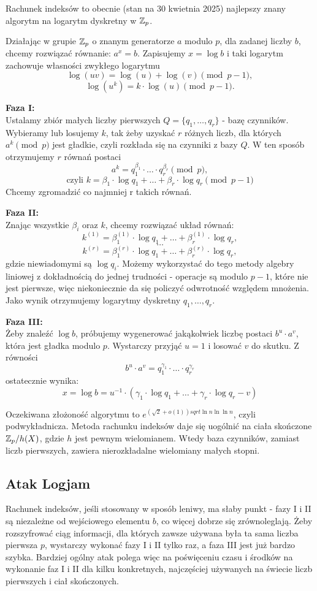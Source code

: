 Rachunek indeksów to obecnie (stan na 30 kwietnia 2025) najlepszy znany algorytm na
logarytm dyskretny w \( \mathbb{Z}_p \).

Działając w grupie \( \mathbb{Z}_p \) o znanym generatorze \( a \) modulo \( p \), dla zadanej liczby \( b \), chcemy rozwiązać równanie: \( a^x = b \).
Zapisujemy \( x = \log b \) i taki logarytm zachowuje własności zwykłego logarytmu
\[ \log(uv) = \log(u) + \log(v) \pmod{p-1}, \]
\[ \log(u^k) = k \cdot \log(u) \pmod{p-1}. \]

\textbf{Faza I:} \\
Ustalamy zbiór małych liczby pierwszych \( Q = \{q_1, \dots, q_r\} \) - bazę czynników.
Wybieramy lub losujemy \( k \), tak żeby uzyskać \( r \) różnych liczb, dla których \( a^k \pmod{p} \) jest gładkie, czyli rozkłada się na czynniki z bazy \( Q \). W ten sposób otrzymujemy \( r \) równań postaci
\[ a^k = q_1^{\beta_1} \cdot \ldots \cdot q_r^{\beta_r} \pmod{p}, \]
\[ \text{czyli } k = \beta_1 \cdot \log q_1 + \ldots + \beta_r \cdot \log q_r \pmod{p - 1} \]
Chcemy zgromadzić co najmniej r takich równań.

\textbf{Faza II:} \\
Znając wszystkie \( \beta_i \) oraz \( k \), chcemy rozwiązać układ równań:
\[ k^{(1)} = \beta_1^{(1)} \cdot \log q_1 + \ldots + \beta_r^{(1)} \cdot \log q_r, \]
\[ \dots \]
\[ k^{(r)} = \beta_1^{(r)} \cdot \log q_1 + \ldots + \beta_r^{(r)} \cdot \log q_r, \]
gdzie niewiadomymi są \( \log q_i \). Możemy wykorzystać do tego metody algebry liniowej z dokładnością do jednej trudności - operacje są modulo \( p-1 \), które nie jest pierwsze, więc niekoniecznie da się policzyć odwrotność względem mnożenia.
Jako wynik otrzymujemy logarytmy dyskretny \( q_1, \dots, q_r \).

\textbf{Faza III:} \\
Żeby znaleźć \( \log b \), próbujemy wygenerować jakąkolwiek liczbę postaci \( b^u \cdot a^v \), która jest gładka modulo \( p \). Wystarczy przyjąć \( u = 1 \) i losować \( v \) do skutku. Z równości
\[ b^u \cdot a^v = q_1^{\gamma_1} \cdot \ldots \cdot q_r^{\gamma_r} \]
ostatecznie wynika:
\[ x = \log b = u^{−1} \cdot (\gamma_1 \cdot \log q_1 + \ldots + \gamma_r \cdot \log q_r - v) \]

Oczekiwana złożoność algorytmu to \( e^{(\sqrt{2}+o(1))sqrt{\ln n \ln\ln n}} \), czyli podwykładnicza. Metoda rachunku indeksów daje się uogólnić na ciała skończone \( \mathbb{Z}_p/h(X) \), gdzie \( h \) jest pewnym wielomianem. Wtedy baza czynników, zamiast liczb pierwszych, zawiera nierozkładalne wielomiany małych stopni.

\subsection{Atak Logjam}
Rachunek indeksów, jeśli stosowany w sposób leniwy, ma słaby punkt - fazy I i II są niezależne od wejściowego elementu \( b \), co więcej dobrze się zrównoleglają.
Żeby rozszyfrować ciąg informacji, dla których zawsze używana była ta sama liczba pierwsza \( p \), wystarczy wykonać fazy I i II tylko raz, a faza III jest już bardzo szybka. Bardziej ogólny atak polega więc na poświęceniu czasu i środków na wykonanie faz I i II dla kilku konkretnych, najczęściej używanych na świecie liczb pierwszych i ciał skończonych.